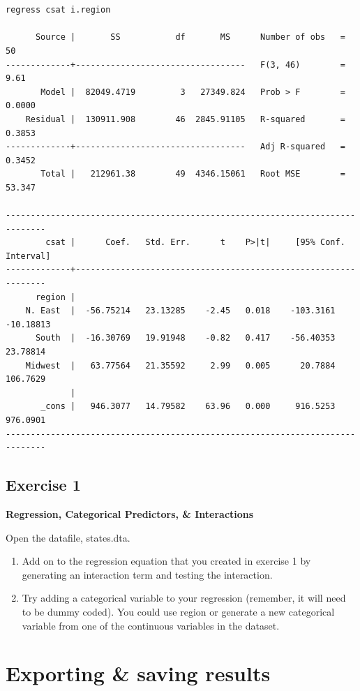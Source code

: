 \documentclass[
]{book}
\providecommand{\tightlist}{%
  \setlength{\itemsep}{0pt}\setlength{\parskip}{0pt}}
\begin{document}
\begin{verbatim}


regress csat i.region

      Source |       SS           df       MS      Number of obs   =        50
-------------+----------------------------------   F(3, 46)        =      9.61
       Model |  82049.4719         3   27349.824   Prob > F        =    0.0000
    Residual |  130911.908        46  2845.91105   R-squared       =    0.3853
-------------+----------------------------------   Adj R-squared   =    0.3452
       Total |   212961.38        49  4346.15061   Root MSE        =    53.347

------------------------------------------------------------------------------
        csat |      Coef.   Std. Err.      t    P>|t|     [95% Conf. Interval]
-------------+----------------------------------------------------------------
      region |
    N. East  |  -56.75214   23.13285    -2.45   0.018    -103.3161   -10.18813
      South  |  -16.30769   19.91948    -0.82   0.417    -56.40353    23.78814
    Midwest  |   63.77564   21.35592     2.99   0.005      20.7884    106.7629
             |
       _cons |   946.3077   14.79582    63.96   0.000     916.5253    976.0901
------------------------------------------------------------------------------
\end{verbatim}

\hypertarget{exercise-1-8}{%
\subsection{Exercise 1}\label{exercise-1-8}}

\textbf{Regression, Categorical Predictors, \& Interactions}

Open the datafile, states.dta.

\begin{enumerate}
\def\labelenumi{\arabic{enumi}.}
\tightlist
\item
  Add on to the regression equation that you created in exercise 1 by generating an interaction term and testing the interaction.
\item
  Try adding a categorical variable to your regression (remember, it will need to be dummy coded). You could use region or generate a new categorical variable from one of the continuous variables in the dataset.
\end{enumerate}

\hypertarget{exporting-saving-results}{%
\section{Exporting \& saving results}\label{exporting-saving-results}}
\end{document}
